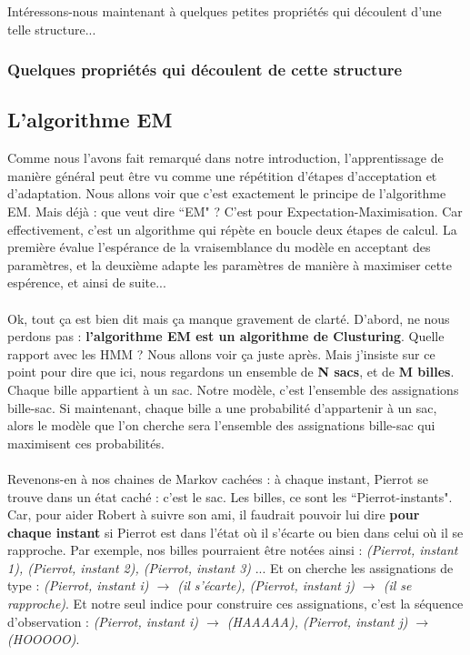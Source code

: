 \documentclass{article}
\begin{document}
Intéressons-nous maintenant à quelques petites propriétés qui découlent d'une telle structure...

\subsubsection{Quelques propriétés qui découlent de cette structure}

\subsection{L'algorithme EM}

Comme nous l'avons fait remarqué dans notre introduction, l'apprentissage de manière général peut être vu comme une répétition d'étapes d'acceptation et d'adaptation. Nous allons voir que c'est exactement le principe de l'algorithme EM. Mais déjà : que veut dire ``EM" ? C'est pour Expectation-Maximisation. Car effectivement, c'est un algorithme qui répète en boucle deux étapes de calcul. La première évalue l'espérance de la vraisemblance du modèle en acceptant des paramètres, et la deuxième adapte les paramètres de manière à maximiser cette espérence, et ainsi de suite...\\
\\
Ok, tout ça est bien dit mais ça manque gravement de clarté. D'abord, ne nous perdons pas : \textbf{l'algorithme EM est un algorithme de Clusturing}. Quelle rapport avec les HMM ? Nous allons voir ça juste après. Mais j'insiste sur ce point pour dire que ici, nous regardons un ensemble de \textbf{N sacs}, et de \textbf{M billes}. Chaque bille appartient à un sac. Notre modèle, c'est l'ensemble des assignations bille-sac. Si maintenant, chaque bille a une probabilité d'appartenir à un sac, alors le modèle que l'on cherche sera l'ensemble des assignations bille-sac qui maximisent ces probabilités. \\
\\
Revenons-en à nos chaines de Markov cachées : à chaque instant, Pierrot se trouve dans un état caché : c'est le sac. Les billes, ce sont les ``Pierrot-instants". Car, pour aider Robert à suivre son ami, il faudrait pouvoir lui dire \textbf{pour chaque instant} si Pierrot est dans l'état où il s'écarte ou bien dans celui où il se rapproche. Par exemple, nos billes pourraient être notées ainsi : \textit{(Pierrot, instant 1), (Pierrot, instant 2), (Pierrot, instant 3)} ... Et on cherche les assignations de type : \textit{(Pierrot, instant i) $\rightarrow$ (il s'écarte), (Pierrot, instant j) $\rightarrow$ (il se rapproche)}. Et notre seul indice pour construire ces assignations, c'est la séquence d'observation : \textit{(Pierrot, instant i) $\rightarrow$ (HAAAAA), (Pierrot, instant j) $\rightarrow$ (HOOOOO)}. \\
\end{document}

